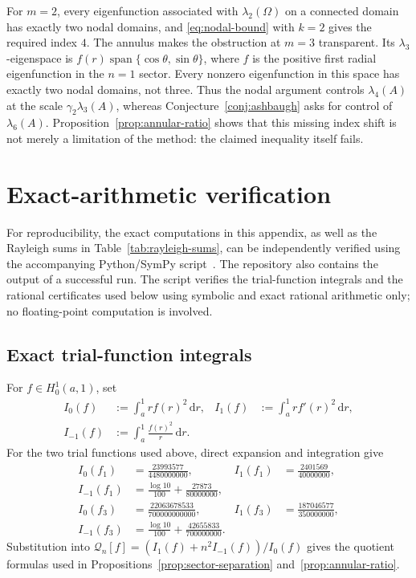 \documentclass[11pt,letterpaper,reqno]{amsart}
\theoremstyle{definition}
\newcommand{\dd}{\,\mathrm{d}}
\begin{document}
For $m=2$, every eigenfunction associated with $\lambda_2(\Omega)$ on a
connected domain has exactly two nodal domains, and
\eqref{eq:nodal-bound} with $k=2$ gives the required index $4$. The annulus makes the obstruction at $m=3$ transparent.  Its
$\lambda_3$-eigenspace is
$f(r)\operatorname{span}\{\cos\theta,\sin\theta\}$, where $f$ is the
positive first radial eigenfunction in the $n=1$ sector.  Every nonzero
eigenfunction in this space has exactly two nodal domains, not three.  Thus
the nodal argument controls $\lambda_4(A)$ at the scale
$\gamma_2\lambda_3(A)$, whereas Conjecture~\ref{conj:ashbaugh} asks for
control of $\lambda_6(A)$.  Proposition~\ref{prop:annular-ratio} shows that
this missing index shift is not merely a limitation of the method: the
claimed inequality itself fails.


\appendix
\section{Exact-arithmetic verification}

For reproducibility, the exact computations in this appendix, as well as the
Rayleigh sums in Table~\ref{tab:rayleigh-sums}, can be independently verified using the accompanying Python/SymPy script~\cite{ExactArithmeticCode}.
The repository also contains the output of a successful run.
The script verifies the trial-function integrals and the rational certificates
used below using symbolic and exact rational arithmetic only; no floating-point
computation is involved.




\subsection{Exact trial-function integrals}\label{app:trial-integrals}

For \(f\in H_0^1(a,1)\), set
\begin{align*}
 I_0(f)&:=\int_a^1r f(r)^2\dd r,
 &I_1(f)&:=\int_a^1r f'(r)^2\dd r,\\
 I_{-1}(f)&:=\int_a^1\frac{f(r)^2}{r}\dd r.
\end{align*}
For the two trial functions used above, direct expansion and integration give
\begin{align*}
 I_0(f_1)&=\frac{23993577}{4480000000},
 &I_1(f_1)&=\frac{2401569}{40000000},\\
 I_{-1}(f_1)&=\frac{\log 10}{100}+\frac{27873}{80000000},\\[2mm]
 I_0(f_3)&=\frac{22063678533}{700000000000},
 &I_1(f_3)&=\frac{187046577}{350000000},\\
 I_{-1}(f_3)&=\frac{\log 10}{100}+\frac{42655833}{700000000}.
\end{align*}
Substitution into
$\mathcal{Q}_n[f]=(I_1(f)+n^2I_{-1}(f))/I_0(f)$ gives the quotient formulas
used in Propositions~\ref{prop:sector-separation} and~\ref{prop:annular-ratio}.
\end{document}
